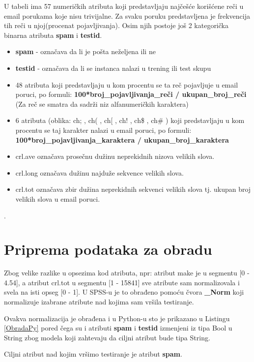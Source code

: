 \documentclass[a4paper]{article}
\begin{document}
U tabeli ima 57 numeričkih atributa koji predstavljaju najčešće korišćene reči u email porukama koje nisu trivijalne. Za svaku poruku predstavljena je frekvencija tih reči u njoj(procenat pojavljivanja). Osim njih postoje još 2 kategorička
binarna atributa \textbf{spam} i \textbf{testid}.

\begin{itemize}
    \item \textbf{spam} - označava da li je pošta neželjena ili ne
    \item \textbf{testid} - označava da li se instanca nalazi u trening ili test skupu
    \item 48 atributa koji predstavljaju u kom procentu se ta reč pojavljuje u email poruci, po formuli:
\textbf{ 100*broj\_pojavljivanja\_reči / ukupan\_broj\_reči}
(Za reč se smatra da sadrži niz alfanumeričkih karaktera)
	\item 6 atributa (oblika: ch; , ch( , ch[ , ch! , ch\$ , ch\# ) koji predstavljaju u kom procentu se taj karakter nalazi u email poruci, po formuli:
\textbf{ 100*broj\_pojavljivanja\_karaktera / ukupan\_broj\_karaktera}
	\item crl.ave označava prosečnu dužinu neprekidnih nizova velikih slova.
	\item crl.long označava dužinu najduže sekvence velikih slova.
	\item crl.tot označava zbir dužina neprekidnih sekvenci velikih slova tj. ukupan broj velikih slova u email poruci.   
\end{itemize}.

\section{Priprema podataka za obradu}
\label{sec:preprocesiranje}

Zbog velike razlike u opsezima kod atributa, npr: atribut make je u segmentu
[0 - 4.54], a atribut crl.tot u segmentu [1 - 15841] sve atribute sam normalizovala i svela na isti opseg [0 - 1]. U SPSS-u je to obrađeno pomoću čvora \textbf{\_Norm} koji normalizuje izabrane atribute nad kojima sam vršila testiranje. 

Ovakva normalizacija je obrađena i u Python-u sto je prikazano u Listingu \ref{ObradaPy} pored čega su i atributi \textbf{spam} i \textbf{testid} izmenjeni iz tipa Bool u String zbog modela koji zahtevaju da ciljni atribut bude tipa String.

Ciljni atribut nad kojim vršimo testiranje je atribut \textbf{spam}.
\end{document}
